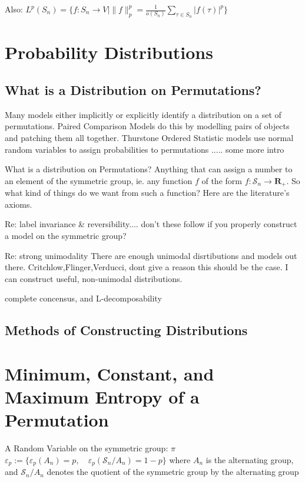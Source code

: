 \documentclass{article}
\theoremstyle{definition}
\begin{document}
Also: \(
L^p(S_n) = \{ f:S_n \rightarrow V \mid \|f\|_p^p = \frac{1}{o(S_n)}\sum_{\tau \in S_n} |f(\tau)|^p \}
\)

\section{Probability Distributions}
\subsection{What is a Distribution on Permutations?}
Many models either implicitly or explicitly identify a distribution on a set of permutations. Paired Comparison Models do this by modelling pairs of objects and patching them all together. Thurstone Ordered Statistic models use normal random variables to assign probabilities to permutations ..... some more intro

What is a distribution on Permutations? Anything that can assign a number to an element of the symmetric group, ie. any function $f$ of the form \(f:\mathcal{S}_n \rightarrow \mathbf{R}_+ \). So what kind of things do we want from such a function? Here are the literature's axioms. 

Re: label invariance & reversibility....
    don't these follow if you properly construct a model on the symmetric group?

Re: strong unimodality
    There are enough unimodal disrtibutions and models out there. Critchlow,Flinger,Verducci, dont give a reason this should be the case. I can construct useful, non-unimodal distributions.
    
complete concensus, and L-decomposability

\subsection{Methods of Constructing Distributions}

\section{Minimum, Constant, and Maximum Entropy of a Permutation }

A Random Variable on the symmetric group:
$ \pi $ ~ $ \varepsilon_p := \{\varepsilon_p(A_n) =p, \quad \varepsilon_p(\mathcal{S}_n / A_n) = 1-p \} $ where $A_n$ is the alternating group, and $\mathcal{S}_n / A_n$ denotes the quotient of the symmetric group by the alternating group
\end{document}
